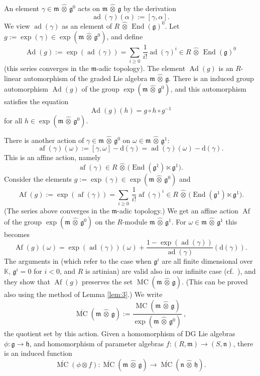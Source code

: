 \documentclass[a4paper,10pt]{amsart}
\theoremstyle{definition}
\numberwithin{equation}{section}
\newcommand{\opn}{\operatorname}
\newcommand{\ol}{\overline}
\newcommand{\mfrak}[1]{\mathfrak{#1}}
\newcommand{\mrm}[1]{\mathrm{#1}}
\newcommand{\mbb}[1]{\mathbb{#1}}
\newcommand{\smfrac}[2]{\textstyle \frac{#1}{#2}}
\newcommand{\ot}{\otimes}
\newcommand{\what}[1]{\widehat{#1}}
\newcommand{\hatotimes}{\, \what{\otimes} \,}
\newcommand{\hot}{\hatotimes}
\newcommand{\K}{\mbb{K}}
\newcommand{\g}{\mfrak{g}}
\newcommand{\m}{\mfrak{m}}
\newcommand{\h}{\mfrak{h}}
\newcommand{\n}{\mfrak{n}}
\renewcommand{\d}{\mrm{d}}
\newcommand{\om}{\omega}
\newcommand{\ga}{\gamma}
\newcommand{\al}{\alpha}
\begin{document}
An element $\ga \in \m \hatotimes \g^0$ acts on $\m \hatotimes \g$ by the
derivation 
\begin{equation}
\opn{ad}(\ga)(\al) := [\ga, \al] .
\end{equation}
We view $\opn{ad}(\ga)$ as an element of $R \hot \opn{End}(\g)^0$.
Let $g := \exp(\gamma) \in \exp(\m \hatotimes \g^0)$, and define 
\begin{equation} \label{eqn:11}
\opn{Ad}(g) := \exp (\opn{ad}(\gamma)) 
 = \sum_{i \geq 0} \, \smfrac{1}{i!} \opn{ad}(\ga)^i
\in R \hot \opn{End}(\g)^0 
\end{equation}
(this series converges in the $\m$-adic topology).
The element $\opn{Ad}(g)$ is an $R$-linear automorphism of the graded Lie
algebra $\m \hatotimes \g$. There is an induced group automorphism
$\opn{Ad}(g)$ of the group $\exp(\m \hatotimes \g^0)$, and this automorphism
satisfies the equation 
\begin{equation} \label{eqn:10}
\opn{Ad}(g)(h) = g \circ h \circ g^{-1} 
\end{equation}
for all $h \in \exp(\m \hatotimes \g^0)$.

There is another action of $\ga \in \m \hatotimes \g^0$ on 
$\om \in \m \hatotimes \g^{1}$:
\begin{equation}
\opn{af}(\ga)(\om) := [\ga, \om] - \d(\ga) = 
\opn{ad}(\ga)(\om) - \d(\ga) .
\end{equation}
This is an affine action, namely 
\[ \opn{af}(\ga) \in R \hot \bigl( \opn{End}(\g^1) \ltimes \g^1 \bigr) . \]
Consider the elements
$g := \exp(\ga) \in \exp(\m \hatotimes \g^0)$
and
\begin{equation}
\opn{Af}(g) := \exp(\opn{af}(\ga)) = 
\sum_{i \geq 0} \, \smfrac{1}{i!} \opn{af}(\ga)^i
\in R \hot \bigl( \opn{End}(\g^1) \ltimes \g^1 \bigr)  .
\end{equation}
(The series above converges in the $\m$-adic topology.) 
We get an affine action $\opn{Af}$ of the group $\exp(\m \hatotimes \g^0)$
on the $R$-module $\m \hatotimes \g^{1}$.
For $\om \in \m \hatotimes \g^1$ this becomes
\[ \opn{Af}(g)(\om) = 
\exp(\opn{ad}(\gamma))(\om) + 
\frac{ 1 - \exp(\opn{ad}(\gamma)) }{ \opn{ad}(\gamma) } (\d(\gamma)) . \]
The arguments in \cite[Section 1.3]{GM} (which refer to the case when
$\g^i$ are all finite dimensional over $\K$, $\g^i = 0$ for $i < 0$, and $R$ is
artinian) are valid also in our infinite case (cf.\ \cite[Section 2.2]{Ge}),
and they show that $\opn{Af}(g)$ preserves  the set 
$\opn{MC}(\m \hatotimes \g)$.
(This can be proved also using the method of Lemma \ref{lem:3}.)
We write
\begin{equation}
\ol{\opn{MC}}(\m \hatotimes \g) := 
\frac{ \opn{MC}(\m \hatotimes \g) }{ 
\opn{exp}(\m \hatotimes \g^0) } \ ,
\end{equation}
the quotient set by this action.
Given a homomorphism of DG Lie algebras 
 $\phi : \g \to \h$, and homomorphism of parameter algebras
$f : (R, \m) \to (S, \n)$, there is an induced function 
\begin{equation}
\ol{\opn{MC}}(\phi \ot f) :
\ol{\opn{MC}}(\m \hatotimes \g) \to
\ol{\opn{MC}}(\n \hatotimes \h) .
\end{equation} 
\end{document}

